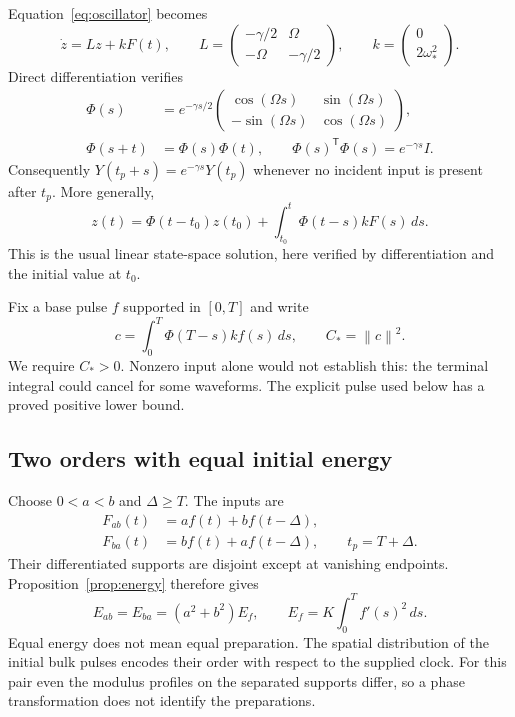 \documentclass[11pt,a4paper]{article}
\theoremstyle{remark}
\newcommand{\norm}[1]{\left\lVert#1\right\rVert}
\begin{document}
Equation~\eqref{eq:oscillator} becomes
\begin{equation}
 \dot z=Lz+kF(t),\qquad
 L=\begin{pmatrix}-\gamma/2&\Omega\\-\Omega&-\gamma/2\end{pmatrix},
 \qquad k=\begin{pmatrix}0\\2\omega_*^2\end{pmatrix}.
 \label{eq:state}
\end{equation}
Direct differentiation verifies
\begin{align}
 \Phi(s)&=e^{-\gamma s/2}
 \begin{pmatrix}\cos(\Omega s)&\sin(\Omega s)\\
 -\sin(\Omega s)&\cos(\Omega s)\end{pmatrix},\\
 \Phi(s+t)&=\Phi(s)\Phi(t),\qquad
 \Phi(s)^{\mathsf T}\Phi(s)=e^{-\gamma s}I.
 \label{eq:propagator}
\end{align}
Consequently $Y(t_p+s)=e^{-\gamma s}Y(t_p)$ whenever no incident
input is present after $t_p$. More generally,
\begin{equation}
 z(t)=\Phi(t-t_0)z(t_0)+\int_{t_0}^t\Phi(t-s)kF(s)\,ds.
 \label{eq:state-convolution}
\end{equation}
This is the usual linear state-space solution\cite{frazzoli}, here
verified by differentiation and the initial value at $t_0$.

Fix a base pulse $f$ supported in $[0,T]$ and write
\begin{equation}
 c=\int_0^T\Phi(T-s)k f(s)\,ds,\qquad C_* =\norm{c}^2.
 \label{eq:unit-response}
\end{equation}
We require $C_*>0$. Nonzero input alone would not establish this:
the terminal integral could cancel for some waveforms. The explicit
pulse used below has a proved positive lower bound.

\subsection{Two orders with equal initial energy}

Choose $0<a<b$ and $\Delta\ge T$. The inputs are
\begin{align}
 F_{ab}(t)&=a f(t)+b f(t-\Delta),\\
 F_{ba}(t)&=b f(t)+a f(t-\Delta),\qquad t_p=T+\Delta.
 \label{eq:orders}
\end{align}
Their differentiated supports are disjoint except at vanishing endpoints.
Proposition~\ref{prop:energy} therefore gives
\begin{equation}
 E_{ab}=E_{ba}=(a^2+b^2)E_f,\qquad
 E_f=K\int_0^T f'(s)^2\,ds.
 \label{eq:equal-energy}
\end{equation}
Equal energy does not mean equal preparation. The spatial distribution
of the initial bulk pulses encodes their order with respect to the supplied
clock. For this pair even the modulus profiles on the separated supports
differ, so a phase transformation does not identify the preparations.
\end{document}
